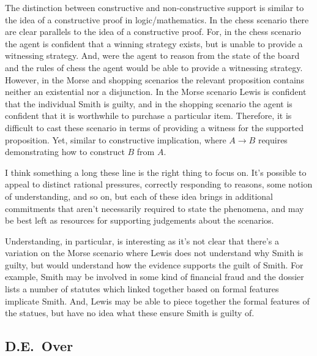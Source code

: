 \documentclass[10pt]{article}
\begin{document}

The distinction between constructive and non-constructive support is similar to the idea of a constructive proof in logic/mathematics.
In the chess scenario there are clear parallels to the idea of a constructive proof.
For, in the chess scenario the agent is confident that a winning strategy exists, but is unable to provide a witnessing strategy.
And, were the agent to reason from the state of the board and the rules of chess the agent would be able to provide a witnessing strategy.
However, in the Morse and shopping scenarios the relevant proposition contains neither an existential nor a disjunction.
In the Morse scenario Lewis is confident that the individual Smith is guilty, and in the shopping scenario the agent is confident that it is worthwhile to purchase a particular item.
Therefore, it is difficult to cast these scenario in terms of providing a witness for the supported proposition.
Yet, similar to constructive implication, where \(A \rightarrow B\) requires demonstrating how to construct \(B\) from \(A\).

\begin{note}
  I think something a long these line is the right thing to focus on.
  It's possible to appeal to distinct rational pressures, correctly responding to reasons, some notion of understanding, and so on, but each of these idea brings in additional commitments that aren't necessarily required to state the phenomena, and may be best left as resources for supporting judgements about the scenarios.

  Understanding, in particular, is interesting as it's not clear that there's a variation on the Morse scenario where Lewis does not understand why Smith is guilty, but would understand how the evidence supports the guilt of Smith.
  For example, Smith may be involved in some kind of financial fraud and the dossier lists a number of statutes which linked together based on formal features implicate Smith.
  And, Lewis may be able to piece together the formal features of the statues, but have no idea what these ensure Smith is guilty of.
\end{note}

\subsection{D.E.\ Over}
\label{sec:d.e.-over}
\end{document}

